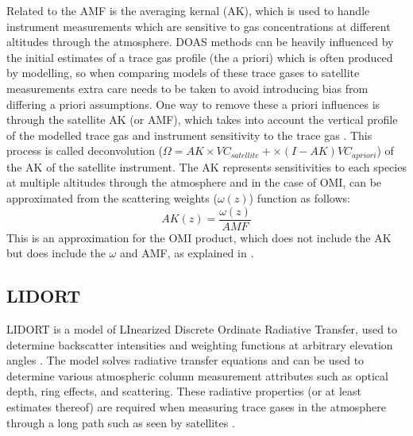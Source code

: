     Related to the AMF is the averaging kernal (AK), which is used to handle instrument measurements which are sensitive to gas concentrations at different altitudes through the atmosphere.
    DOAS methods can be heavily influenced by the initial estimates of a trace gas profile (the a priori) which is often produced by modelling, so when comparing models of these trace gases to satellite measurements extra care needs to be taken to avoid introducing bias from differing a priori assumptions.
    One way to remove these a priori influences is through the satellite AK (or AMF), which takes into account the vertical profile of the modelled trace gas and instrument sensitivity to the trace gas \parencite{Eskes2003, Palmer2001}.
    This process is called deconvolution ($\Omega = AK \times VC_{satellite} + \times (I - AK) VC_{a priori}$) of the AK of the satellite instrument.
    The AK represents sensitivities to each species at multiple altitudes through the atmosphere and in the case of OMI, can be approximated from the scattering weights ($\omega(z)$) function as follows:
    \begin{equation} \label{ch_HCHO:eqn:AKfromw}
    AK(z) = \frac{\omega(z)}{AMF}
    \end{equation}
    This is an approximation for the OMI product, which does not include the AK but does include the $\omega$ and AMF, as explained in \textcite{Abad2015}.
  
  \subsection{LIDORT}
    \label{Model:Meas:sat:LIDORT}
    
    LIDORT is a model of LInearized Discrete Ordinate Radiative Transfer, used to determine backscatter intensities and weighting functions at arbitrary elevation angles \parencite{Spurr2001}.
    The model solves radiative transfer equations and can be used to determine various atmospheric column measurement attributes such as optical depth, ring effects, and scattering.
    These radiative properties (or at least estimates thereof) are required when measuring trace gases in the atmosphere through a long path such as seen by satellites \parencite[eg.][]{Palmer2001,Martin2002a,DeSmedt2015,Abad2015}.
  
